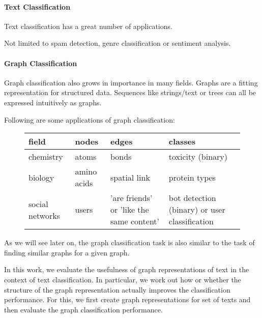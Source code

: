 

\paragraph{Text Classification}
Text classification has a great number of applications.

Not limited to spam detection, genre classification or sentiment analysis.

\paragraph{Graph Classification}
Graph classification also grows in importance in many fields.
Graphs are a fitting representation for structured data.
Sequences like strings/text or trees can all be expressed intuitively as graphs.

Following are some applications of graph classification:

\begin{figure}[ht]
\centering
\begin{tabular}{llll}
field & nodes & edges & classes \\
\midrule
chemistry & atoms & bonds & toxicity (binary) \\
biology & amino acids & spatial link & protein types \\ 
social networks & users & 'are friends' or 'like the same content' & bot detection (binary) or user classification
\end{tabular}
\end{figure}

As we will see later on, the graph classification task is also similar to the task of finding similar graphs for a given graph.

In this work, we evaluate the usefulness of graph representations of text in the context of text classification. In particular, we work out how or whether the structure of the graph representation actually improves the classification performance.
For this, we first create graph representations for set of texts and then evaluate the graph classification performance.

